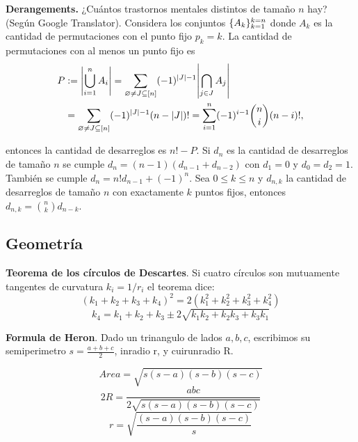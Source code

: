 \documentclass[12 pts,spanish,mexico]{article}
\numberwithin{equation}{section}
\DeclarePairedDelimiter{\set}{\{}{\}}
\begin{document}
\begin{multicols}{2}
\textbf{Derangements.} ¿Cuántos trastornos mentales distintos de tamaño $n$ hay? (Según Google Translator). Considera los conjuntos $\set{A_k}_{k = 1}^{k = n}$ donde $A_k$ es la cantidad de permutaciones con el punto fijo $p_k = k$. La cantidad de permutaciones con al menos un punto fijo es
\begin{align*}
	P &:= \abs{\bigcup_{i = 1}^n A_i} = \sum_{\varnothing \neq J \subseteq [n]} (-1)^{|J| - 1}\abs{\bigcap_{j \in J} A_j}\\
	&= \sum_{\varnothing \neq J \subseteq [n]} (-1)^{|J| - 1}(n - |J|)!
	= \sum_{i = 1}^n (-1)^{i - 1}\binom{n}{i}(n - i)!,
\end{align*}

entonces la cantidad de desarreglos es $n! - P$. Si $d_n$ es la cantidad de desarreglos de tamaño $n$ se cumple $d_n = (n - 1)(d_{n  -1} + d_{n - 2})$ con $d_1 = 0$ y $d_0 = d_2 = 1$. También se cumple $d_n = n!d_{n - 1} + (-1)^n$. Sea $0 \leq k \leq n$ y $d_{n, k}$ la cantidad de desarreglos de tamaño $n$ con exactamente $k$ puntos fijos, entonces $d_{n, k} = \binom{n}{k}d_{n - k}$.

\subsection{Geometría}

\textbf{Teorema de los círculos de Descartes}. Si cuatro círculos son mutuamente tangentes de curvatura $k_i= 1/r_i$ el teorema dice:
\begin{equation*}
    (k_1+k_2+k_3+k_4)^2 = 2\left( k_1^2 +k_2^2 +k_3^2 +k_4^2   \right)
\end{equation*}
\begin{equation*}
    k_4 = k_1+k_2+k_3 \pm 2\sqrt{k_1k_2+k_2k_3+k_3k_1}
\end{equation*}

\textbf{Formula de Heron}. Dado un trinangulo de lados $a, b, c$, escribimos su semiperimetro $s = \frac{a+b+c}{2}$, inradio r, y cuirunradio R.

\begin{equation*}
    Area = \sqrt{s(s-a)(s-b)(s-c)}
\end{equation*}
\begin{equation*}
    2R = \frac{abc}{2  \sqrt{s(s-a)(s-b)(s-c)}}
\end{equation*}
\begin{equation*}
    r =  \sqrt{\frac{(s-a)(s-b)(s-c)}{s} }
\end{equation*}


\end{multicols}
\end{document}
